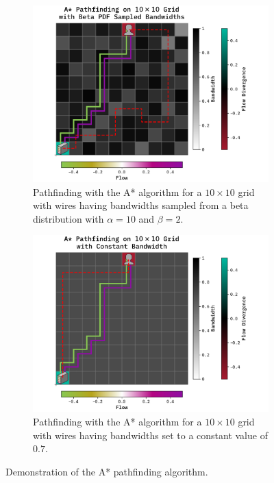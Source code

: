 \documentclass[10pt, titlepage, a4paper]{article}
\begin{document}
\begin{figure}[H]
    \centering
    \begin{subfigure}[t]{0.45\textwidth}
        \includegraphics[width=\textwidth]{../Images/astar-test-beta.pdf}
        \caption{Pathfinding with the A* algorithm for a $10\times 10$ grid with wires having bandwidths sampled from a beta distribution with $\alpha = 10$ and $\beta = 2$.}
        \label{fig:astar-beta}
    \end{subfigure}\hspace{1.0cm}
    \begin{subfigure}[t]{0.45\textwidth}
        \includegraphics[width=\textwidth]{../Images/astar-test-const.pdf}
        \caption{Pathfinding with the A* algorithm for a $10\times 10$ grid with wires having bandwidths set to a constant value of $0.7$.}
        \label{fig:astar-const}
    \end{subfigure}
    \caption{Demonstration of the A* pathfinding algorithm.}
    \label{fig:astar}
\end{figure}
\end{document}
